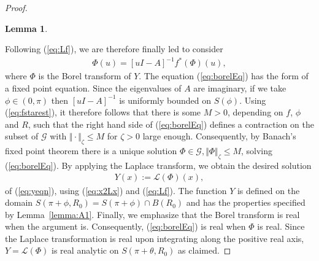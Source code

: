\documentclass[reqno,12pt]{amsart}
\newcommand{\eqlab}[1]{\label{eq:#1}}
\renewcommand{\eqref}[1]{(\ref{eq:#1})}
\newcommand{\lemmaref}[1]{Lemma~\ref{lemma:#1}}
\newtheorem{lemma}[theorem]{Lemma}
\numberwithin{equation}{section}
\begin{document}
\begin{proof}
\begin{lemma}
\end{lemma}
Following \eqref{Lf}, we are therefore finally led to consider 
\begin{align}
 \Phi(u) = [u I -A]^{-1} f^*(\Phi)(u),\eqlab{borelEq}
\end{align}
where $\Phi$ is the Borel transform of $Y$. The equation \eqref{borelEq} has the form of a fixed point equation. Since the eigenvalues of $A$ are imaginary, if we take $\phi\in (0,\pi)$ then $[uI-A]^{-1}$ is uniformly bounded on $S(\phi)$. 
% 
Using \eqref{fstarest}, it therefore follows that there is some $M>0$, depending on $f$, $\phi$ and $R$, such that the right hand side of \eqref{borelEq} defines a contraction on the subset of $\mathcal G$ with $\Vert \cdot \Vert_\zeta\le M$ for $\zeta>0$ large enough. Consequently, by Banach's fixed point theorem there is a unique solution $\Phi\in \mathcal G, \Vert \Phi \Vert_\zeta\le M$, solving \eqref{borelEq}. By applying the Laplace transform, we obtain the desired solution
\begin{align*}
 Y(x) := \mathcal L(\Phi)(x),
\end{align*}
 of \eqref{yeqn},
using \eqref{x2Lx} and \eqref{Lf}. The function $Y$ is defined on the domain $S(\pi+\phi,R_0)=S(\pi+\phi)\cap B(R_0)$ and has the properties specified by \lemmaref{A1}. Finally, we emphasize that the Borel transform is real when the argument is. Consequently, \eqref{borelEq} is real when $\Phi$ is real. Since the Laplace transformation is real upon integrating along the positive real axis, $Y=\mathcal L(\Phi)$ is real analytic on $S(\pi+\theta,R_0)$ as claimed.
 \end{proof}
\end{document}
